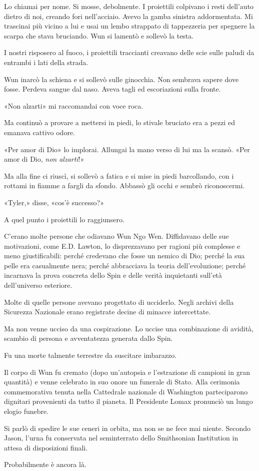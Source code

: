 Lo chiamai per nome. Si mosse, debolmente. I proiettili colpivano i
resti dell'auto dietro di noi, creando fori nell'acciaio. Avevo la gamba
sinistra addormentata. Mi trascinai più vicino a lui e usai un lembo
strappato di tappezzeria per spegnere la scarpa che stava bruciando. Wun
si lamentò e sollevò la testa.

I nostri risposero al fuoco, i proiettili traccianti creavano delle scie
sulle paludi da entrambi i lati della strada.

Wun inarcò la schiena e si sollevò sulle ginocchia. Non sembrava sapere
dove fosse. Perdeva sangue dal naso. Aveva tagli ed escoriazioni sulla
fronte.

«Non alzarti» mi raccomandai con voce roca.

Ma continuò a provare a mettersi in piedi, lo stivale bruciato era a
pezzi ed emanava cattivo odore.

«Per amor di Dio» lo implorai. Allungai la mano verso di lui ma la
scansò. «Per amor di Dio, \emph{non alzarti}!»

Ma alla fine ci riuscì, si sollevò a fatica e si mise in piedi
barcollando, con i rottami in fiamme a fargli da sfondo. Abbassò gli
occhi e sembrò riconoscermi.

«Tyler,» disse, «cos'è successo?»

A quel punto i proiettili lo raggiunsero.

\separatorefiori

C'erano molte persone che odiavano Wun Ngo Wen. Diffidavano delle sue
motivazioni, come E.D. Lawton, lo disprezzavano per ragioni più
complesse e meno giustificabili: perché credevano che fosse un nemico di
Dio; perché la sua pelle era casualmente nera; perché abbracciava la
teoria dell'evoluzione; perché incarnava la prova concreta dello Spin e
delle verità inquietanti sull'età dell'universo esteriore.

Molte di quelle persone avevano progettato di ucciderlo. Negli archivi
della Sicurezza Nazionale erano registrate decine di minacce
intercettate.

Ma non venne ucciso da una cospirazione. Lo uccise una combinazione di
avidità, scambio di persona e avventatezza generata dallo Spin.

Fu una morte talmente terrestre da suscitare imbarazzo.

Il corpo di Wun fu cremato (dopo un'autopsia e l'estrazione di campioni
in gran quantità) e venne celebrato in suo onore un funerale di Stato.
Alla cerimonia commemorativa tenuta nella Cattedrale nazionale di
Washington parteciparono dignitari provenienti da tutto il pianeta. Il
Presidente Lomax pronunciò un lungo elogio funebre.

Si parlò di spedire le sue ceneri in orbita, ma non se ne fece mai
niente. Secondo Jason, l'urna fu conservata nel seminterrato dello
Smithsonian Institution in attesa di disposizioni finali.

Probabilmente è ancora là.